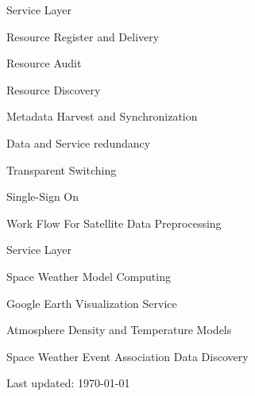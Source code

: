 \documentclass[10pt,letterpaper]{article}
\renewenvironment{itemize}{
  \begin{list}{}{
    \setlength{\leftmargin}{1.5em}
    \setlength{\itemsep}{0.25em}
    \setlength{\parskip}{0pt}
    \setlength{\parsep}{0.25em}
  }
}{
  \end{list}
}
\begin{document}
\begin{itemize}
\begin{itemize}
	\item Service Layer
	\begin{itemize}
	\item Resource Register and Delivery
	\item Resource Audit
	\item Resource Discovery
        \item Metadata Harvest and Synchronization
      	\item Data and Service redundancy
      	\item Transparent Switching
        \item Single-Sign On
	\item Work Flow For Satellite Data Preprocessing
	\end{itemize}
	
	\item Service Layer
	\begin{itemize}
	\item Space Weather Model Computing 
	\item Google Earth Visualization Service
      	\item Atmosphere Density and Temperature Models
	\item Space Weather Event Association Data Discovery
	\end{itemize}
\end{itemize}
\end{itemize}

\bigskip

\begin{center}
  \begin{small}
    Last updated: \today
  \end{small}
\end{center}
\end{document}
